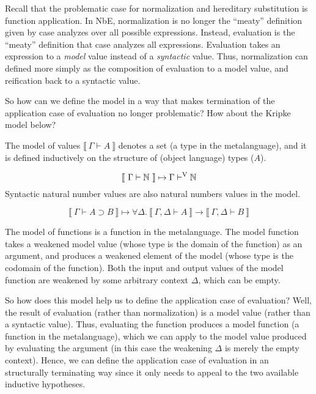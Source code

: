 \documentclass{llncs}
\newenvironment{mydefinition}[3]
{ \begin{mydefinition'}[#1] \label{def:#2}
  \hfill\break
  #3
}
{ \end{mydefinition'} }
\def\dfn{\mapsto}
\def\arr{\supset}
\def\marr{\rightarrow}
\def\nat{\mathbb{N}}
\newcommand{\turn}[1]{\vdash^\con{#1}}
\newcommand{\all}[1]{\forall#1.~}
\newcommand{\el}[1]{\llbracket ~ #1 ~ \rrbracket}
\newcommand{\con}[1]{\textmd{#1}}
\newcommand{\typm}[1]{\el{\Gamma \vdash #1}}
\newcommand{\gdtypm}[1]{\el{\Gamma, \Delta \vdash #1}}
\newcommand{\typv}[1]{\Gamma \turn{V} #1}
\begin{document}
Recall that the problematic case for normalization and hereditary
substitution is function application. In NbE, normalization is no
longer the ``meaty'' definition given by case analyzes over all
possible expressions. Instead, evaluation is the ``meaty'' definition
that case analyzes all expressions. Evaluation takes an expression
to a \textit{model} value instead of a \textit{syntactic} value.
Thus, normalization can defined more simply as the composition of
evaluation to a model value, and reification back to a syntactic value.

So how can we define the model in a way that makes termination of the
application case of evaluation no longer problematic? How about the
Kripke model below?

\begin{mydefinition}{Model of Values}{mval}
{
The model of values $\typm{A}$ denotes a set (a type in the
metalanguage), and it is defined inductively on the structure
of (object language) types ($A$).
}

\begin{mycase}
$$
\typm{\nat} \dfn \typv{\nat}
$$
Syntactic natural number values are also natural numbers values in the
model.
\end{mycase}

\begin{mycase}[Functions]
$$
\typm{A \arr B} \dfn \all{\Delta} \gdtypm{A} \marr \gdtypm{B}
$$

The model of functions is a function in the metalanguage.
The model function takes a weakened model value (whose type is
the domain of the function) as an argument, and produces a
weakened element of the model (whose type is the codomain of the
function). Both the input and output values of the model function are
weakened by some arbitrary context $\Delta$, which can be empty.
\end{mycase}

\end{mydefinition}

So how does this model help us to define the application case of
evaluation? Well, the result of evaluation (rather than
normalization) is a model value (rather than a syntactic value).
Thus, evaluating the function produces a model
function (a function in the metalanguage), which we can apply to the model value produced by evaluating
the argument (in this case the weakening $\Delta$ is merely the empty
context). Hence, we can define the application case of evaluation in
an structurally terminating way since it only needs to appeal to the
two available inductive hypotheses.
\end{document}
